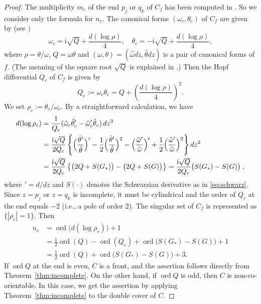 \documentclass[a4paper]{amsart}
\theoremstyle{plain}
\theoremstyle{remark}
\numberwithin{equation}{section}
\begin{document}
\begin{proof}
 The multiplicity $m_c$ of the end $p_j$ or $q_k$ of
 $C_f$ has been
 computed in \cite[Theorems 7.4 and 7.6]{KRUY}. 
So we consider only the  formula for $n_c$.
 The canonical forms $(\omega_c,\theta_c)$ of $C_f$
 are given by (see \cite[(6.5)]{KRUY})
 \[
      \omega_c={\mathrm{i}}\sqrt{Q}+\frac{d(\log \rho)}4,
          \quad
      \theta_c=-{\mathrm{i}}\sqrt{Q}+\frac{d(\log \rho)}4,
 \]
 where $\rho=\theta/\omega$, $Q=\omega\theta$ and
 $(\omega,\theta)=(\hat \omega dz,\hat \theta dz)$ 
 is a pair of canonical forms
 of $f$. 
 (The meaning of the square root $\sqrt{Q}$ is
 explained in \cite{KRUY}.) 
 Then the Hopf differential $Q_c$ of $C_f$ is given by
 \[
      Q_c:=\omega_c\theta_c=Q+\left(\frac{d(\log \rho)}{4}\right)^2.
 \]
 We set $\rho_c:=\theta_c/\omega_c$.
 By a straightforward calculation, we have
 \begin{align*}
  d(\log \rho_c)&=\frac1{Q_c}(\hat\omega_c\hat\theta'_c
  -\hat\omega'_c\hat\theta_c)\, dz^3 \\
  &=\frac{{\mathrm{i}} \sqrt{Q}}{2Q_c}
  \left\{ 
  \Bigl(\frac{\hat\theta'}{\hat\theta}\Bigr)'
      -\frac12\Bigl(\frac{\hat \theta'}{\hat \theta}\Bigr)^2
      -\Bigl(\frac{\hat\omega'}{\hat\omega}\Bigr)'
      +\frac12\Bigl(\frac{\hat\omega'}{\hat\omega}\Bigr)^2
  \right\} dz^2 \\
  &=\frac{{\mathrm{i}} \sqrt{Q}}{2Q_c}
  \left\{
  \bigl(2Q+S(G_*)\bigr)-\bigl(2Q+S(G)\bigr)
  \right\}
  =\frac{{\mathrm{i}} \sqrt{Q}}{2Q_c}\bigl(S(G_*)-S(G)\bigr) \;,
 \end{align*}
 where $'=d/dz$ and $S(\cdot)$ denotes the Schwarzian derivative as in
 \eqref{eq:schwarz}.
 Since $z=p_j$ or $z=q_k$ is incomplete,
 it must be cylindrical and the order of $Q_c$ at the end equals
 $-2$ (i.e., a pole of order $2$).
 The singular set of $C_f$ is represented as $\{|\rho_c|=1\}$. 
 Then
 \begin{align*}
    n_c&={\operatorname{ord}} \bigl(d(\log \rho_c)\bigr)+1\\
    &=
    \frac1{2}{\operatorname{ord}}(Q)-{\operatorname{ord}}(Q_c)+{\operatorname{ord}}\bigl(S(G_*)-S(G)\bigr)+1\\
    &=\frac1{2}{\operatorname{ord}}(Q)+{\operatorname{ord}}\bigl(S(G_*)-S(G)\bigr)+3.
 \end{align*}
 If ${\operatorname{ord}} Q$ at the end is even, $C$ is a front, and
 the assertion  follows directly from Theorem~\ref{thm:incomplete}.
 On the other hand, if ${\operatorname{ord}} Q$ is odd, then $C$ is non-co-orientable.
 In this case, we get 
 the assertion by applying Theorem~\ref{thm:incomplete}
to the double cover of $C$.
\end{proof}
\end{document}
